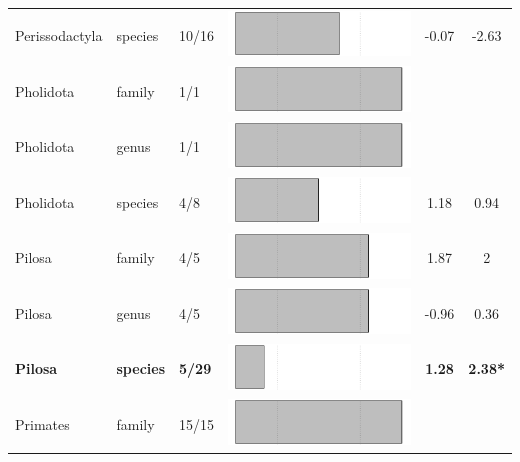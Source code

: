 \begin{longtable}{lL{1.8cm}C{2cm}lcc}
  Perissodactyla & species & 10/16 & \includegraphics[width=0.20\linewidth, height=0.05\linewidth]{Results_1c/Table_figures/bar57.pdf} & -0.07 & -2.63 \\ 
  Pholidota & family & 1/1 & \includegraphics[width=0.20\linewidth, height=0.05\linewidth]{Results_1c/Table_figures/bar58.pdf} &   &   \\ 
  Pholidota & genus & 1/1 & \includegraphics[width=0.20\linewidth, height=0.05\linewidth]{Results_1c/Table_figures/bar59.pdf} &   &   \\ 
  Pholidota & species & 4/8 & \includegraphics[width=0.20\linewidth, height=0.05\linewidth]{Results_1c/Table_figures/bar60.pdf} & 1.18 & 0.94 \\ 
  Pilosa & family & 4/5 & \includegraphics[width=0.20\linewidth, height=0.05\linewidth]{Results_1c/Table_figures/bar61.pdf} & 1.87 & 2 \\ 
  Pilosa & genus & 4/5 & \includegraphics[width=0.20\linewidth, height=0.05\linewidth]{Results_1c/Table_figures/bar62.pdf} & -0.96 & 0.36 \\ 
  \textbf{Pilosa} & \textbf{species} & \textbf{5/29} & \includegraphics[width=0.20\linewidth, height=0.05\linewidth]{Results_1c/Table_figures/bar63.pdf} & \textbf{1.28} & \textbf{2.38*} \\ 
  Primates & family & 15/15 & \includegraphics[width=0.20\linewidth, height=0.05\linewidth]{Results_1c/Table_figures/bar64.pdf} &   &   \\ 

\end{longtable}
